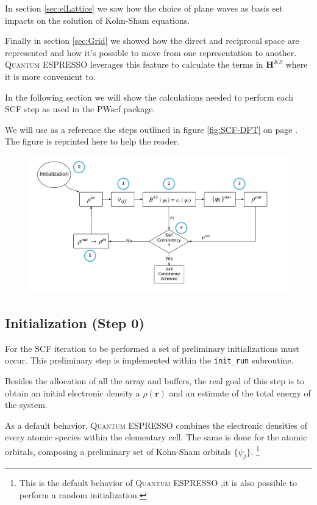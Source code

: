 \documentclass[a4paper,12pt]{article}
\newcommand\mf[1]{\mathbf{#1}}
\newcommand\dens{\rho(\mathbf{r})}
\newcommand\QE{\textsc{Quantum} ESPRESSO }
\begin{document}
In section \ref{sec:elLattice} we saw how the choice of plane waves as basis set impacts on the solution of Kohn-Sham equations.

Finally in section \ref{sec:Grid} we showed how the direct and reciprocal space are represented and how it's possible to move from one representation to another. 
\QE leverages this feature to calculate the terms in $\mf{H}^{KS}$ where it is more convenient to.


In the following section we will show the calculations needed to perform each SCF step as used in the PWscf package.

We will use as a reference the steps outlined in figure \ref{fig:SCF-DFT} on page \pageref{fig:SCF-DFT}.
The figure is reprinted here to help the reader.

\begin{figure}[h]
	\includegraphics[width=\linewidth]{SCF-DFT_schema.pdf}	
\end{figure}

\subsection{Initialization (Step 0)}
For the SCF iteration to be performed a set of preliminary initializations must occur.
This preliminary step is implemented within the \texttt{init\_run} subroutine.

Besides the allocation of all the array and buffers, the real goal of this step is to obtain an initial electronic density a $\dens$ and an estimate of the total energy of the system.

As a default behavior, \QE combines the electronic densities of every atomic species within the elementary cell.
The same is done for the atomic orbitals, composing a preliminary set of Kohn-Sham orbitals $\{\psi_j\}$.
\footnote{This is the default behavior of \QE ,it is also possible to perform a random initialization.}
\end{document}
